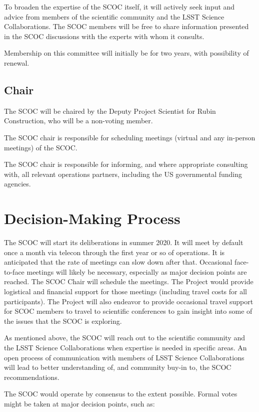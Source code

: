 \documentclass[OPS,lsstdraft,authoryear,toc]{lsstdoc}
\begin{document}
To broaden the expertise of the SCOC itself, it will actively seek input and advice from members
of the scientific community and the LSST Science Collaborations.
The SCOC members will be free to share information presented in the SCOC discussions with the
experts with whom it consults.

Membership on this committee will initially be for two years, with possibility of renewal.


\subsection{Chair}

The SCOC will be chaired by the Deputy Project Scientist for Rubin Construction, who will be a non-voting member.

The SCOC chair is responsible for scheduling meetings (virtual and any in-person meetings) of the SCOC.

The SCOC chair is responsible for informing, and where appropriate consulting with, all relevant operations partners, including the US governmental funding agencies.



\section{Decision-Making Process}

The SCOC will start its deliberations in summer 2020.
It will meet by default once a month via telecon through the first year or so of operations.
It is anticipated that the rate of meetings can slow down after that.
Occasional face-to-face meetings will likely be necessary, especially as major decision points are reached.
The SCOC Chair will schedule the meetings.
The Project would provide logistical and financial support for those meetings
(including travel costs for all participants).
The Project will also endeavor to provide occasional travel support for SCOC members to travel
to scientific conferences to gain insight into some of the issues that the SCOC is exploring.

As mentioned above, the SCOC will reach out to the scientific community and the
LSST Science Collaborations when expertise is needed in specific areas.
An open process of communication with members of LSST Science Collaborations will
lead to better understanding of, and community buy-in to, the SCOC recommendations.

The SCOC would operate by consensus to the extent possible.
Formal votes might be taken at major decision points, such as:
\end{document}
